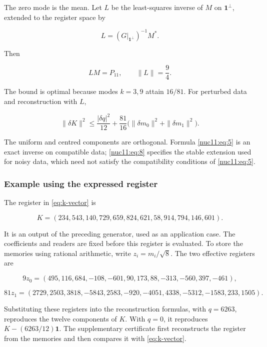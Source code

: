 The zero mode is the mean. Let \(L\) be the least-squares inverse of \(M\) on \(\mathbf1^\perp\), extended to the register space by

\[
L=(G|_{\mathbf1^\perp})^{-1}M^*.
\]

Then

\begin{equation}
LM=P_{11},\qquad \|L\|=\frac94.
\label{nuc11:eq:8}
\end{equation}

The bound is optimal because modes \(k=3,9\) attain \(16/81\). For perturbed data and reconstruction with \(L\),

\begin{equation}
\|\delta K\|^2\le \frac{|\delta q|^2}{12}
+\frac{81}{16}\bigl(\|\delta m_0\|^2+\|\delta m_1\|^2\bigr).
\label{nuc11:eq:9}
\end{equation}

The uniform and centred components are orthogonal. Formula \eqref{nuc11:eq:5} is an exact inverse on compatible data; \eqref{nuc11:eq:8} specifies the stable extension used for noisy data, which need not satisfy the compatibility conditions of \eqref{nuc11:eq:5}.

\subsubsection{Example using the expressed register}

The register in \eqref{eq:k-vector} is

\begin{equation}
K=(234,543,140,729,659,824,621,58,914,794,146,601).
\label{nuc11:eq:10}
\end{equation}

It is an output of the preceding generator, used as an application case. The coefficients and readers are fixed before this register is evaluated. To store the memories using rational arithmetic, write \(z_i=m_i/\sqrt8\). The two effective registers are

\[
9z_0=(495,116,684,-108,-601,90,173,88,-313,-560,397,-461),
\]

\begin{equation}
81z_1=(2729,2503,3818,-5843,2583,-920,-4051,4338,-5312,-1583,233,1505).
\label{nuc11:eq:11}
\end{equation}

Substituting these registers into the reconstruction formulas, with \(q=6263\), reproduces the twelve components of \(K\). With \(q=0\), it reproduces \(K-(6263/12)\mathbf1\). The supplementary certificate first reconstructs the register from the memories and then compares it with \eqref{eq:k-vector}.

